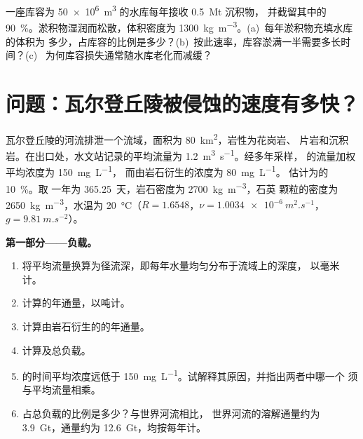 \begin{exercise}[$\star\star\star$]\label{exo:b1:erosion-transport:12}
一座库容为 \qty{50e6}{m^3} 的水库每年接收 \qty{0.5}{Mt} 沉积物，
并截留其中的 \qty{90}{\percent}。淤积物湿润而松散，体积密度为
\qty{1300}{kg.m^{-3}}。(a)~每年淤积物充填水库的体积为
多少，占库容的比例是多少？(b)~按此速率，库容淤满一半需要多长时间？(c)~
为何库容损失通常随水库老化而减缓？
\end{exercise}

\section{问题：瓦尔登丘陵被侵蚀的速度有多快？}

\begin{problem}
\label{pb:b1:erosion-transport:1}
瓦尔登丘陵的河流排泄一个流域，面积为 \qty{80}{km^2}，岩性为花岗岩、
片岩和沉积岩。在出口处，水文站记录的平均流量为
\qty{1.2}{m^3.s^{-1}}。经多年采样，
的流量加权平均浓度为 \qty{150}{mg.L^{-1}}，
而由岩石衍生的浓度为 \qty{80}{mg.L^{-1}}。
估计为的 \qty{10}{\percent}。取
一年为 \num{365.25}~天，岩石密度为 \qty{2700}{kg.m^{-3}}，石英
颗粒的密度为 \qty{2650}{kg.m^{-3}}，水温为 \qty{20}{\celsius}（$R
= 1.6548$，$\nu = \qty{1.0034e-6}{m^2.s^{-1}}$，$g = \qty{9.81}{m.s^{-2}}$）。

\medskip
\noindent\textbf{第一部分——负载。}
\begin{enumerate}
  \item 将平均流量换算为径流深，即每年水量均匀分布于流域上的深度，
        以毫米计。
  \item 计算的年通量，以吨计。
  \item 计算由岩石衍生的的年通量。
  \item 计算及总负载。
  \item {}的时间平均浓度远低于
        \qty{150}{mg.L^{-1}}。试解释其原因，并指出两者中哪一个
        须与平均流量相乘。
  \item {}占总负载的比例是多少？与世界河流相比，
        世界河流的溶解通量约为
        \qty{3.9}{Gt}，通量约为 \qty{12.6}{Gt}，均按每年计。
\end{enumerate}


\end{problem}

